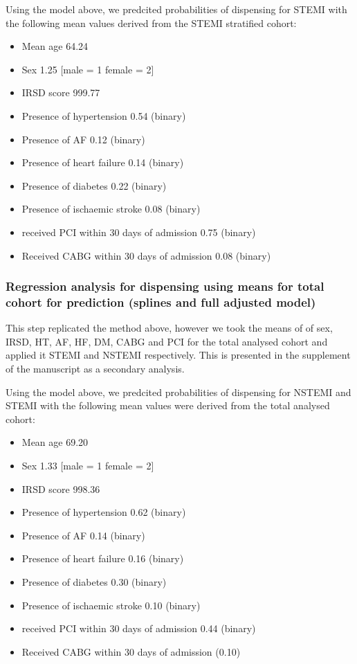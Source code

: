 \documentclass[11pt]{article}
\begin{document}
Using the model above, we predcited probabilities of dispensing for STEMI with the following mean values derived from the STEMI stratified cohort: \\
\begin{itemize}
\item Mean age 64.24
\item Sex 1.25 [male = 1 female = 2]
\item IRSD score 999.77
\item Presence of hypertension 0.54 (binary)
\item Presence of AF 0.12 (binary)
\item Presence of heart failure 0.14 (binary)
\item Presence of diabetes 0.22 (binary)
\item Presence of ischaemic stroke 0.08 (binary)
\item received PCI within 30 days of admission 0.75 (binary)
\item Received CABG within 30 days of admission 0.08 (binary)
\end{itemize}
\color{violet}
\begin{stlog}\end{stlog}
\color{black}
\subsubsection{Regression analysis for dispensing using means for total cohort for prediction (splines and full adjusted model)}
This step replicated the method above, however we took the means of of sex, IRSD, HT, AF, HF, DM, CABG and PCI for the total analysed cohort and applied it STEMI and NSTEMI respectively. This is presented in the supplement of the manuscript as a secondary analysis. 
\color{violet}
\begin{stlog}\end{stlog}
\color{black}
Using the model above, we predcited probabilities of dispensing for NSTEMI and STEMI with the following mean values were derived from the total analysed cohort: \\
\begin{itemize}
\item Mean age 69.20
\item Sex 1.33 [male = 1 female = 2]
\item IRSD score 998.36
\item Presence of hypertension 0.62 (binary)
\item Presence of AF 0.14 (binary)
\item Presence of heart failure 0.16 (binary)
\item Presence of diabetes 0.30 (binary)
\item Presence of ischaemic stroke 0.10 (binary)
\item received PCI within 30 days of admission 0.44 (binary)
\item Received CABG within 30 days of admission (0.10)
\end{itemize}
\color{violet}
\begin{stlog}\end{stlog}
\color{black}
\end{document}
